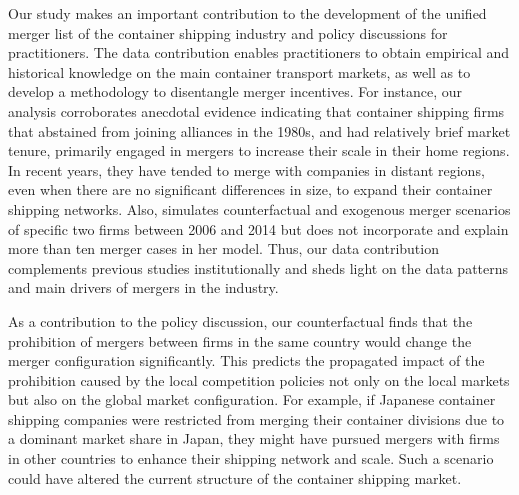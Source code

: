 \documentclass[10pt]{article}
\begin{document}
Our study makes an important contribution to the development of the unified merger list of the container shipping industry and policy discussions for practitioners. 
The data contribution enables practitioners to obtain empirical and historical knowledge on the main container transport markets, as well as to develop a methodology to disentangle merger incentives.
For instance, our analysis corroborates anecdotal evidence indicating that container shipping firms that abstained from joining alliances in the 1980s, and had relatively brief market tenure, primarily engaged in mergers to increase their scale in their home regions. 
In recent years, they have tended to merge with companies in distant regions, even when there are no significant differences in size, to expand their container shipping networks.
Also, \cite{jeon2022learning} simulates counterfactual and exogenous merger scenarios of specific two firms between 2006 and 2014 but does not incorporate and explain more than ten merger cases in her model.
Thus, our data contribution complements previous studies institutionally and sheds light on the data patterns and main drivers of mergers in the industry.

As a contribution to the policy discussion, our counterfactual finds that the prohibition of mergers between firms in the same country would change the merger configuration significantly. 
This predicts the propagated impact of the prohibition caused by the local competition policies not only on the local markets but also on the global market configuration. 
For example, if Japanese container shipping companies were restricted from merging their container divisions due to a dominant market share in Japan, they might have pursued mergers with firms in other countries to enhance their shipping network and scale. Such a scenario could have altered the current structure of the container shipping market.
\end{document}

